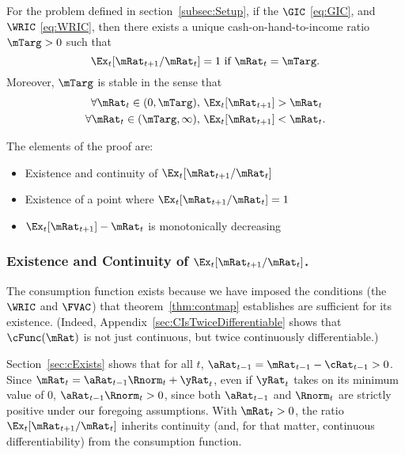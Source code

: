\documentclass[BufferStockTheory]{subfiles}
\begin{document}
\begin{theorem}
  \label{thm:target} For the problem defined in section~\ref{subsec:Setup}, 
  if the $\GIC$ \eqref{eq:GIC}, and $\WRIC$ \eqref{eq:WRIC}, 
 then there exists a unique cash-on-hand-to-income ratio $\mTarg>0$ such that
  \begin{equation}  
    \Ex_t [{\mRat}_{t+1}/\mRat_t] = 1 \mbox{~if~} \mRat_t = \mTarg. 
    \label{eq:mTarget}
  \end{equation}
  Moreover, $\mTarg$ is stable in the sense that
  \begin{align}\label{eq:stability}
    \forall {\mRat}_t\in(0,\mTarg),      \,\,& \Ex_t [{\mRat}_{t+1}] > {\mRat}_t  \\
    \forall {\mRat}_t\in(\mTarg,\infty), \,\,& \Ex_t [{\mRat}_{t+1}] < {\mRat}_t. \notag
  \end{align}

\end{theorem}

The elements of the proof are:
\begin{itemize}
\item Existence and continuity of $\Ex_t [{\mRat}_{t+1}/\mRat_t]$
\item Existence of a point where $\Ex_t [{\mRat}_{t+1}/\mRat_t] = 1$
\item $\Ex_t [{\mRat}_{t+1}]-\mRat_{t}$ is monotonically decreasing
\end{itemize}

\subsubsection{Existence and Continuity of $\Ex_t [{\mRat}_{t+1}/\mRat_t]$.}
The consumption function exists because we have imposed the conditions (the $\WRIC$ and $\FVAC$) that theorem~\ref{thm:contmap} establishes are sufficient for its existence.  (Indeed, Appendix~\ref{sec:CIsTwiceDifferentiable} shows that $\cFunc(\mRat)$ is not just continuous, but twice continuously differentiable.)

Section~\ref{sec:cExists} shows that for all $t$, $\aRat_{t-1} = {\mRat}_{t-1} -  \cRat_{t-1} > 0$.  Since ${\mRat}_{t}= {\aRat}_{t-1} \Rnorm_{t} + \yRat_{t}$, even if $\yRat_{t}$ takes on its minimum value of 0, $\aRat_{t-1} \Rnorm_{t} > 0$, since both $\aRat_{t-1}$ and $\Rnorm_{t}$ are strictly positive under our foregoing assumptions.  With $\mRat_{t} > 0$, the ratio $\Ex_t [{\mRat}_{t+1}/\mRat_t]$ inherits continuity (and, for that matter, continuous differentiability) from the consumption function.
\end{document}
